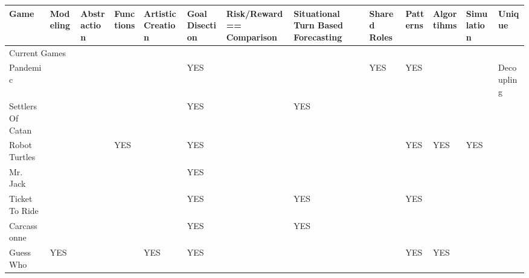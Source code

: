 \documentclass{acm_proc_article-sp}
\begin{document}
\clearpage
\begin{sidewaystable}[htbp]
\tiny
    \vspace*{-12cm}\hspace*{-1cm}\begin{tabular}{|p{1.3cm}||p{1cm}|p{2cm}|p{2cm}|p{1.6cm}|p{2cm}|p{1cm}|p{2cm}|p{1cm}|p{1.3cm}|p{2.7cm}|p{1cm}|p{1.6cm}|}
    
    \hline

    Game & Modeling & Abstraction & Functions & Artistic Creation & Goal Disection & Risk/Reward == Comparison & Situational Turn Based Forecasting & Shared Roles & Patterns & Algortihms & Simulation & Unique \\ \hline \hline
    
    \multicolumn{13}{|l|}{Current Games}  \\ \hline \hline
    
    Pandemic & ~ & ~ & ~ & ~ & \cellcolor{blue!25} YES & ~ & ~ & \cellcolor{blue!25}YES & \cellcolor{blue!25}YES & ~ & ~ & Decoupling \\ \hline
    
    Settlers Of Catan & ~ & ~ & ~ & ~ & \cellcolor{blue!25}YES & ~ & \cellcolor{blue!25}YES & ~ & ~ & ~ & ~ & ~ \\ \hline

    Robot Turtles & ~ & ~ & \cellcolor{blue!25}YES & ~ & \cellcolor{blue!25}YES & ~ & ~ & ~ & \cellcolor{blue!25}YES & \cellcolor{blue!25}YES & \cellcolor{blue!25}YES & ~ \\ \hline

    Mr. Jack & ~ & ~ & ~ & ~ & \cellcolor{blue!25}YES & ~ & ~ & ~ & ~ & ~ & ~ & ~ \\ \hline

    Ticket To Ride & ~ & ~ & ~ & ~ & \cellcolor{blue!25}YES & ~ & \cellcolor{blue!25}YES & ~ & \cellcolor{blue!25}YES & ~ & ~ & ~ \\ \hline

    Carcassonne & ~ & ~ & ~ & ~ & \cellcolor{blue!25}YES & ~                                                   & \cellcolor{blue!25}YES & ~ & ~ & ~ & ~ & ~ \\ \hline

    Guess Who & \cellcolor{blue!25}YES & ~ & ~ & \cellcolor{blue!25}YES & \cellcolor{blue!25}YES & ~ & ~ & ~ & \cellcolor{blue!25}YES & \cellcolor{blue!25}YES & ~ & ~ \\ \hline


\end{tabular}
\end{sidewaystable}
\end{document}

